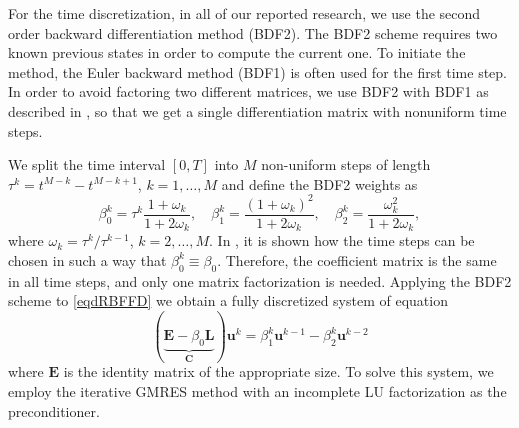 \documentclass{UUThesisTemplate}
\begin{document}
\par
For the time discretization, in all of our reported research, we use the second order backward differentiation method (BDF2). The BDF2 scheme requires two known previous states in order to compute the current one. To initiate the method, the Euler backward method (BDF1) is often used for the first time step. In order to avoid factoring two different matrices, we use BDF2 with BDF1 as described in \cite{larsson2008multi}, so that we get a single differentiation matrix with nonuniform time steps.

\par
We split the time interval $[0,T]$ into $M$ non-uniform steps of length $\tau^{k} = t^{M-k}-t^{M-k+1}$, $k = 1,\ldots,M$ and define the BDF2 weights as
%
\begin{equation}
\beta_0^k = \tau^k\frac{1+\omega_k}{1+2\omega_k},\quad
\beta_1^k = \frac{(1+\omega_k)^2}{1+2\omega_k},\quad
\beta_2^k = \frac{\omega_k^2}{1+2\omega_k},
\end{equation}
%
where $\omega_k=\tau^k/\tau^{k-1}$, $k=2,\ldots,M$. In \cite{larsson2008multi}, it is shown how the time steps can be chosen in such a way that $\beta_0^k\equiv \beta_0$. Therefore, the coefficient matrix is the same in all time steps, and only one matrix factorization is needed. Applying the BDF2 scheme to \eqref{eqdRBFFD} we obtain a fully discretized system of equation
\begin{equation}
(\underbrace{\mathbf{E}-\beta_0 \mathbf{L}}_{\mathbf{C}})
\mathbf{u}^k
= \beta_1^k\mathbf{u}^{k-1} - \beta_2^k\mathbf{u}^{k-2}
\label{impl:system}
\end{equation}
where $\mathbf{E}$ is the identity matrix of the appropriate size. To solve this system, we employ the iterative GMRES method with an incomplete LU factorization as the preconditioner.
\end{document}
